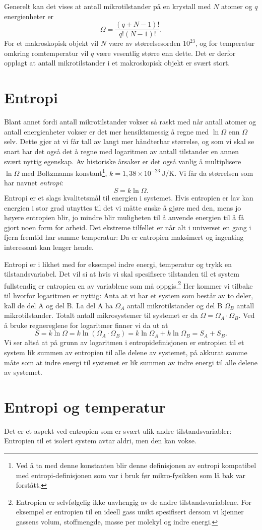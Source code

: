 Generelt kan det vises at antall mikrotilstander på en krystall med $N$ atomer og $q$ energienheter er 
\begin{displaymath}
	\Omega = \frac{(q+N-1)!}{q!(N-1)!}.
\end{displaymath}
For et makroskopisk objekt vil $N$ være av størrelsesorden $10^{23}$, og for temperatur omkring romtemperatur vil $q$ være vesentlig større enn dette. Det er derfor opplagt at antall mikrotilstander i et makroskopisk objekt er svært stort. 

\section{Entropi}
Blant annet fordi antall mikrotilstander vokser så raskt med når antall atomer og antall energienheter vokser er det mer hensiktsmessig å regne med $\ln\Omega$ enn $\Omega$ selv. Dette gjør at vi får tall av langt mer håndterbar størrelse, og som vi skal se snart har det også det å regne med logaritmen av antall tilstander en annen svært nyttig egenskap. Av historiske årsaker er det også vanlig å multiplisere $\ln\Omega$ med Boltzmanns konstant\footnote{Ved å ta med denne konstanten blir denne definisjonen av entropi kompatibel med entropi-definisjonen som var i bruk før mikro-fysikken som lå bak var forstått.}, $k=1,38\times10^{-23}~\mathrm{J/K}$. Vi får da størrelsen som har navnet \emph{entropi}:
\begin{displaymath}
	S = k\ln\Omega.
\end{displaymath}
Entropi er et slags kvalitetsmål til energien i systemet. Hvis entropien er lav kan energien i stor grad utnyttes til det vi måtte ønske å gjøre med den, mens jo høyere entropien blir, jo mindre blir muligheten til å anvende energien til å få gjort noen form for arbeid. Det ekstreme tilfellet er når alt i universet en gang i fjern fremtid har samme temperatur: Da er entropien maksimert og ingenting interessant kan lenger hende.

Entropi er i likhet med for eksempel indre energi, temperatur og trykk en tilstandsvariabel. Det vil si at hvis vi skal spesifisere tilstanden til et system fullstendig er entropien en av variablene som må oppgis.\footnote{Entropien er selvfølgelig ikke uavhengig av de andre tilstandsvariablene. For eksempel er entropien til en ideell gass unikt spesifisert dersom vi kjenner gassens volum, stoffmengde, masse per molekyl og indre energi.} Her kommer vi tilbake til hvorfor logaritmen er nyttig: Anta at vi har et system som består av to deler, kall de del A og del B. La del A ha $\Omega_A$ antall mikrotilstander og del B $\Omega_B$ antall mikrotilstander. Totalt antall mikrosystemer til systemet er da $\Omega = \Omega_A\cdot\Omega_B$. Ved å bruke regnereglene for logaritmer finner vi da ut at 
\begin{displaymath}
	S = k\ln\Omega = k\ln(\Omega_A\cdot\Omega_B) = k\ln\Omega_A + k\ln\Omega_B = S_A + S_B.
\end{displaymath}
Vi ser altså at på grunn av logaritmen i entropidefinisjonen er entropien til et system lik summen av entropien til alle delene av systemet, på akkurat samme måte som at indre energi til systemet er lik summen av indre energi til alle delene av systemet. 

\section{Entropi og temperatur}
Det er et aspekt ved entropien som er svært ulik andre tilstandsvariabler: Entropien til et isolert system avtar aldri, men den kan vokse.